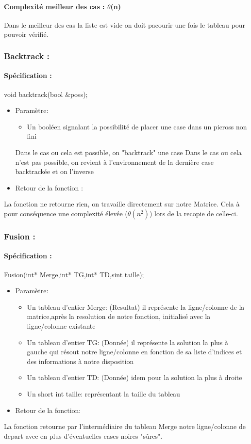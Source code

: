 \documentclass{article}
\begin{document}
\paragraph{Complexité meilleur des cas : $\theta$(n)\newline}
Dans le meilleur des cas la liste est vide on doit pacourir une fois le tableau pour pouvoir vérifié.
\subsubsection{Backtrack :}
\paragraph{Spécification :}
 void backtrack(bool \&poss);
\begin{itemize}
\item Param\`etre:
\begin{itemize}
\item Un booléen signalant la possibilité de placer une case dans un picross non fini
\end{itemize}
Dans le cas ou cela est possible, on "backtrack" une case
Dans le cas ou cela n'est pas possible, on revient à l'environnement de la dernière case backtrackée et on l'inverse
\item Retour de la fonction :
\end{itemize}
La fonction ne retourne rien, on travaille directement sur notre Matrice.\newline
Cela à pour conséquence une complexité élevée ($\theta(n^2)$) lors de la recopie de celle-ci.
\subsubsection{Fusion :}
\paragraph{Spécification :}Fusion(int* Merge,int* TG,int* TD,sint taille);
\begin{itemize}
\item Param\`etre:
\begin{itemize}
\item Un tableau d'entier Merge: (Resultat) il représente la ligne/colonne de la matrice,apr\`es la resolution de notre fonction, initialisé avec la ligne/colonne existante
\item Un tableau d'entier TG: (Donnée) il représente la solution la plus à gauche qui résout notre ligne/colonne en fonction de sa liste d'indices et des informations à notre disposition
\item Un tableau d'entier TD: (Donnée) idem pour la solution la plus à droite
\item Un short int taille: représentant la taille du tableau
\end{itemize}
\item Retour de la fonction:
\end{itemize}
La fonction retourne par l'intermédiaire du tableau Merge notre ligne/colonne de depart avec en plus d'éventuelles cases noires "sûres".
\end{document}
